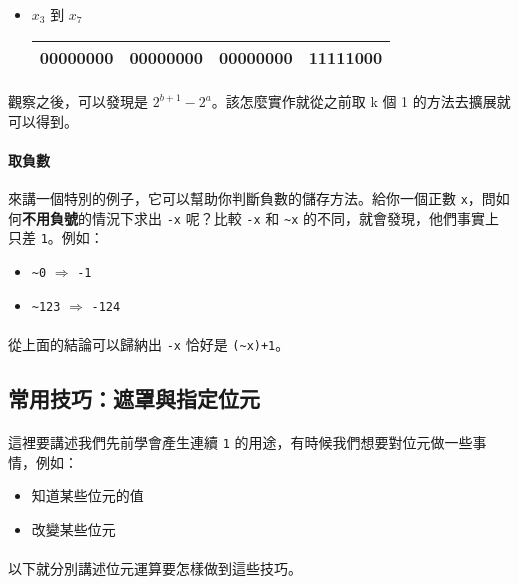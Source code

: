 \documentclass[12pt,a4paper,oneside]{report}
\begin{document}
\begin{CJK}{UTF8}{bkai}
\begin{itemize}
\item $x_3$ 到 $x_7$
\begin{table}[h!]
\centering
\begin{tabular}{|c|c|c|c|}
\hline
00000000 & 00000000 & 00000000 & \textbf{11111}000\\
\hline
\end{tabular}
\end{table}
\end{itemize}

\paragraph{}觀察之後，可以發現是 $2^{b+1}-2^a$。該怎麼實作就從之前取 k 個 1 的方法去擴展就可以得到。
\paragraph{取負數}來講一個特別的例子，它可以幫助你判斷負數的儲存方法。給你一個正數 \lstinline!x!，問如何\textbf{不用負號}的情況下求出 \lstinline!-x! 呢？比較 \lstinline!-x! 和 \lstinline!~x! 的不同，就會發現，他們事實上只差 \lstinline!1!。例如：
\begin{itemize}
\item \lstinline!~0! $\Rightarrow$ \lstinline!-1!
\item \lstinline!~123! $\Rightarrow$ \lstinline!-124!
\end{itemize}

\paragraph{}從上面的結論可以歸納出 \lstinline!-x! 恰好是 \lstinline!(~x)+1!。

\subsection{常用技巧：遮罩與指定位元}

\paragraph{}這裡要講述我們先前學會產生連續 \lstinline!1! 的用途，有時候我們想要對位元做一些事情，例如：
\begin{itemize}
\item 知道某些位元的值
\item 改變某些位元
\end{itemize}
\paragraph{}以下就分別講述位元運算要怎樣做到這些技巧。

\end{CJK}
\end{document}
